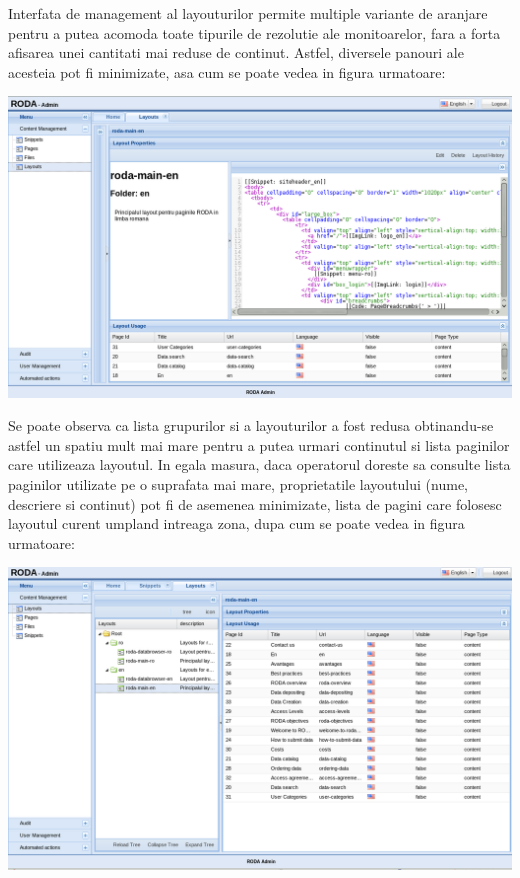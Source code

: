 Interfata de management al layouturilor permite multiple variante
de aranjare pentru a putea acomoda toate tipurile de rezolutie ale
monitoarelor, fara a forta afisarea unei cantitati mai reduse de continut.
Astfel, diversele panouri ale acesteia pot fi minimizate, asa cum
se poate vedea in figura urmatoare:

\includegraphics[width=15cm]{cms/backend/layout/cmslayout7}

Se poate observa ca lista grupurilor si a layouturilor a fost redusa
obtinandu-se astfel un spatiu mult mai mare pentru a putea urmari
continutul si lista paginilor care utilizeaza layoutul. In egala masura,
daca operatorul doreste sa consulte lista paginilor utilizate pe o
suprafata mai mare, proprietatile layoutului (nume, descriere si continut)
pot fi de asemenea minimizate, lista de pagini care folosesc layoutul
curent umpland intreaga zona, dupa cum se poate vedea in figura urmatoare:

\includegraphics[width=15cm]{cms/backend/layout/cmslayout8}


